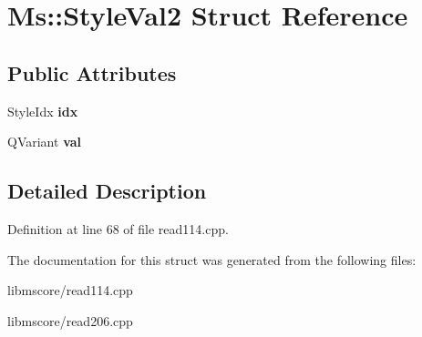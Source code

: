 \hypertarget{struct_ms_1_1_style_val2}{}\section{Ms\+:\+:Style\+Val2 Struct Reference}
\label{struct_ms_1_1_style_val2}
\subsection*{Public Attributes}
\begin{DoxyCompactItemize}
\item 
\mbox{\label{struct_ms_1_1_style_val2_ab9644bf3df5106935098793dd20d0956}} 
Style\+Idx {\bfseries idx}
\item 
\mbox{\label{struct_ms_1_1_style_val2_adbcfd061f685a080eccaebc051337b3f}} 
Q\+Variant {\bfseries val}
\end{DoxyCompactItemize}


\subsection{Detailed Description}


Definition at line 68 of file read114.\+cpp.



The documentation for this struct was generated from the following files\+:\begin{DoxyCompactItemize}
\item 
libmscore/read114.\+cpp\item 
libmscore/read206.\+cpp\end{DoxyCompactItemize}
